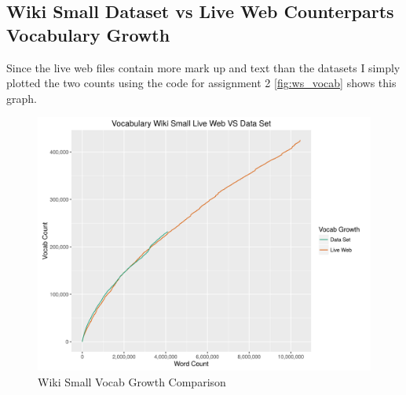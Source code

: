 \documentclass[11pt]{article}
\newenvironment{code}{\captionsetup{type=listing}}{}
\begin{document}
\subsection*{Wiki Small Dataset vs Live Web Counterparts Vocabulary Growth} 
Since the live web files contain more mark up and text than the datasets I simply plotted the two counts using the code for assignment 2 \autoref{fig:ws_vocab} shows this graph.
\begin{figure}[H]
\centering
\includegraphics[scale=0.8]{wikismall_vocab_compare.png}
\caption{Wiki Small Vocab Growth Comparison}
\label{fig:ws_vocab}
\end{figure}
\begin{code}
\label{code:wsmall}
\end{code}
\begin{code}
\label{code:wsmall_help}
\end{code}
\begin{code}
\label{code:wsmall_vocab}
\end{code}
\begin{code}
\label{code:wsmall_plotter}
\end{code}
\newpage
\begin{code}
\label{code:util}
\end{code}
\begin{code}
\label{code:nxc}
\end{code}
\begin{code}
\label{code:cntxc}
\end{code}
\end{document}
